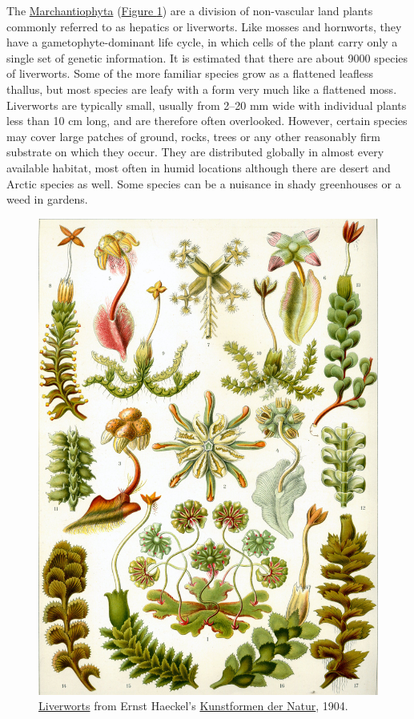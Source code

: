 The
\href{https://en.wikipedia.org/wiki/Marchantiophyta}{Marchantiophyta}
(\href{https://commons.wikimedia.org/wiki/File:Haeckel_Hepaticae.jpg}{Figure
\ref{fig:hepatica}}) are a division of non-vascular land plants commonly
referred to as hepatics or liverworts. Like mosses and hornworts, they
have a gametophyte-dominant life cycle, in which cells of the plant
carry only a single set of genetic information. It is estimated that
there are about 9000 species of liverworts. Some of the more familiar
species grow as a flattened leafless thallus, but most species are leafy
with a form very much like a flattened moss. Liverworts are typically
small, usually from 2--20 mm wide with individual plants less than 10 cm
long, and are therefore often overlooked. However, certain species may
cover large patches of ground, rocks, trees or any other reasonably firm
substrate on which they occur. They are distributed globally in almost
every available habitat, most often in humid locations although there
are desert and Arctic species as well. Some species can be a nuisance in
shady greenhouses or a weed in gardens.

\begin{figure}

{\centering \includegraphics[width=0.7\linewidth]{./figures/mosses/Haeckel_Hepaticae}

}

\caption{\href{https://commons.wikimedia.org/wiki/File:Haeckel_Hepaticae.jpg}{Liverworts}
from Ernst Haeckel's
\href{https://en.wikipedia.org/wiki/Kunstformen_der_Natur}{Kunstformen
der Natur}, 1904.}\label{fig:hepatica}
\end{figure}

